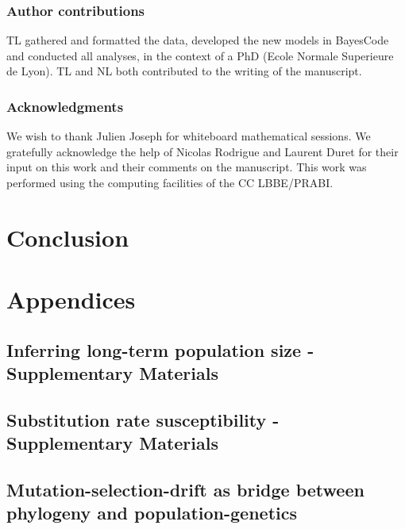 \documentclass[a4paper,oneside,nobind]{thesis}
\begin{document}
\section{Author contributions}
TL gathered and formatted the data, developed the new models in BayesCode and conducted all analyses, in the context of a PhD (Ecole Normale Superieure de Lyon).
TL and NL both contributed to the writing of the manuscript.

\section{Acknowledgments}
We wish to thank Julien Joseph for whiteboard mathematical sessions.
We gratefully acknowledge the help of Nicolas Rodrigue and Laurent Duret for their input on this work and their comments on the manuscript.
This work was performed using the computing facilities of the CC LBBE/PRABI.

\part{Conclusion}
\label{part:conclusion}


\part{Appendices}

\thispagestyle{empty}
\chapter{Inferring long-term population size - Supplementary Materials}
{\hypersetup{linkcolor=GREYDARK}\minitoc}
\label{chap:MutSelDrift-SuppMat}


\thispagestyle{empty}
\chapter{Substitution rate susceptibility - Supplementary Materials}
{\hypersetup{linkcolor=GREYDARK}\minitoc}
\label{chap:GenoPhenoFit-SuppMat}


\chapter*{Mutation-selection-drift as bridge between phylogeny and population-genetics}
\label{sec-appendix:PRF}


\thispagestyle{empty}
\label{sec-appendix:MutSelM3starMBE}


\thispagestyle{empty}


\end{document}
